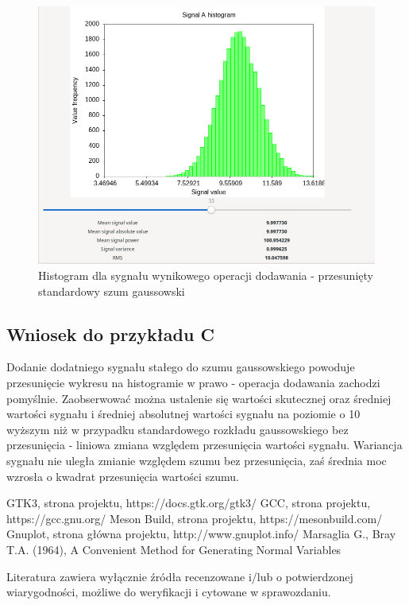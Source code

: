 \documentclass{article}
\begin{document}
\newpage
\begin{figure}[h!]
 \centering
 \includegraphics[width=14cm]{shifted_gauss_hist.png}
 \vspace{-0.3cm}
 \caption{Histogram dla sygnału wynikowego operacji dodawania - przesunięty standardowy szum gaussowski}
 \label{fig:shifted_gauss_hist}
\end{figure}
\newpage
\subsection{Wniosek do przykładu C}
Dodanie dodatniego sygnału stałego do szumu gaussowskiego powoduje przesunięcie wykresu na histogramie w prawo - operacja dodawania zachodzi pomyślnie. Zaobserwować można ustalenie się wartości skutecznej oraz średniej wartości sygnału i średniej absolutnej wartości sygnału na poziomie o 10 wyższym niż w przypadku standardowego rozkładu gaussowskiego bez przesunięcia - liniowa zmiana względem przesunięcia wartości sygnału. Wariancja sygnału nie uległa zmianie względem szumu bez przesunięcia, zaś średnia moc wzrosła o kwadrat przesunięcia wartości szumu.

\begin{thebibliography}{0}
 GTK3, strona projektu, https://docs.gtk.org/gtk3/
 GCC, strona projektu, https://gcc.gnu.org/  
 Meson Build, strona projektu, https://mesonbuild.com/
 Gnuplot, strona główna projektu, http://www.gnuplot.info/
 Marsaglia G., Bray T.A. (1964), A Convenient Method for Generating Normal Variables
\end{thebibliography}

Literatura zawiera wyłącznie źródła recenzowane i/lub o potwierdzonej wiarygodności,
możliwe do weryfikacji i cytowane w sprawozdaniu. 
\end{document}
